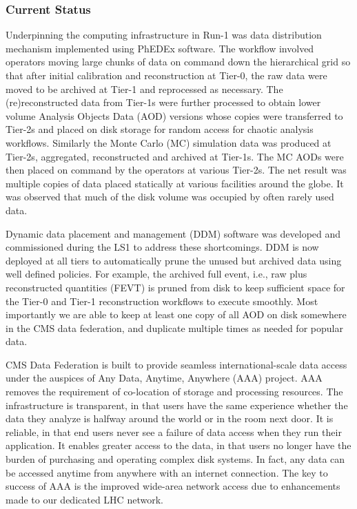 \documentclass[11pt,a4paper]{article}
\begin{document}
\subsubsection{Current Status}


Underpinning the computing infrastructure in Run-1 was data
distribution mechanism implemented using PhEDEx software. The workflow
involved operators moving large chunks of data on command down the
hierarchical grid so that after initial calibration and reconstruction
at Tier-0, the raw data were moved to be archived at Tier-1 and
reprocessed as necessary. The (re)reconstructed data from Tier-1s were
further processed to obtain lower volume Analysis Objects Data (AOD)
versions whose copies were transferred to Tier-2s and placed on disk
storage for random access for chaotic analysis workflows.  Similarly
the Monte Carlo (MC) simulation data was produced at Tier-2s,
aggregated, reconstructed and archived at Tier-1s. The MC AODs were
then placed on command by the operators at various Tier-2s. The net
result was multiple copies of data placed statically at various
facilities around the globe. It was observed that much of the disk
volume was occupied by often rarely used data.

Dynamic data placement and management (DDM) software was developed and
commissioned during the LS1 to address these shortcomings. DDM is now
deployed at all tiers to automatically prune the unused but archived
data using well defined policies.  For example, the archived full
event, i.e., raw plus reconstructed quantities (FEVT) is pruned from
disk to keep sufficient space for the Tier-0 and Tier-1 reconstruction
workflows to execute smoothly. Most importantly we are able to keep at
least one copy of all AOD on disk somewhere in the CMS data
federation, and duplicate multiple times as needed for popular data.


CMS Data Federation is built to provide seamless international-scale data
access  under the auspices of Any Data, Anytime, Anywhere
(AAA) project. AAA removes the requirement of co-location of storage and
processing resources.  The infrastructure is transparent, in that
users have the same experience whether the data they analyze is
halfway around the world or in the room next door.  It is reliable, in
that end users never see a failure of data access when they run their
application.  It enables greater access to the data, in that users no
longer have the burden of purchasing and operating complex disk
systems. In fact, any data can be accessed anytime from anywhere with
an internet connection. The key to success of AAA is the improved
wide-area network access due to enhancements made to our dedicated LHC
network.
\end{document}
